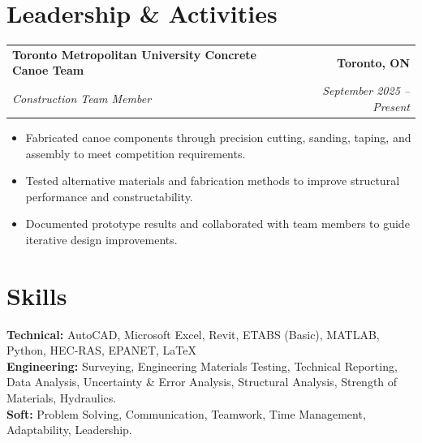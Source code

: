 \documentclass[11pt]{article}
\newcommand{\entry}[4]{%
  \begin{tabularx}{\textwidth}{X r}
    \textbf{#1} & \textbf{#2} \\
    \textit{#3} & \textit{#4} \\
  \end{tabularx}\vspace{-2pt}
}
\newcommand{\tightItem}[1]{\item \small #1}
\begin{document}
\section*{Leadership \& Activities}
\entry
{Toronto Metropolitan University Concrete Canoe Team}{Toronto, ON}
{Construction Team Member }{September 2025 -- Present}
\begin{itemize}
  \tightItem{Fabricated canoe components through precision cutting, sanding, taping, and assembly to meet competition requirements.}
  \tightItem{Tested alternative materials and fabrication methods to improve structural performance and constructability.}
  \tightItem{Documented prototype results and collaborated with team members to guide iterative design improvements.}
\end{itemize}


\section*{Skills}
\small{
\textbf{Technical:} AutoCAD, Microsoft Excel, Revit, ETABS (Basic), MATLAB, Python, HEC-RAS, EPANET, LaTeX \\
\textbf{Engineering:} Surveying, Engineering Materials Testing, Technical Reporting, Data Analysis, Uncertainty \& Error Analysis, Structural Analysis, Strength of Materials, Hydraulics.  \\
\textbf{Soft:} Problem Solving, Communication, Teamwork, Time Management, Adaptability, Leadership. 
}
\end{document}
